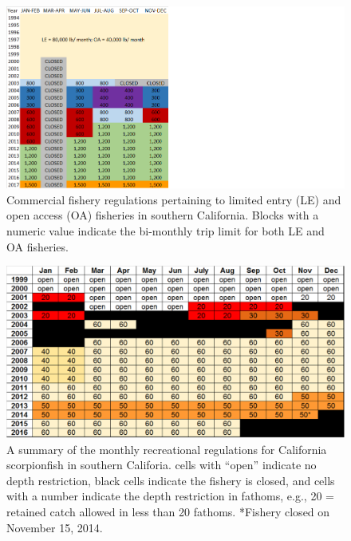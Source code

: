 \documentclass[12pt,]{article}
\begin{document}
\FloatBarrier

\begin{figure}[htbp]
\centering
\includegraphics{Figures/Com_regs.png}
\caption{Commercial fishery regulations pertaining to limited entry (LE)
and open access (OA) fisheries in southern California. Blocks with a
numeric value indicate the bi-monthly trip limit for both LE and OA
fisheries. \label{fig:Com_regs}}
\end{figure}

\FloatBarrier

\FloatBarrier

\begin{figure}[htbp]
\centering
\includegraphics{Figures/Rec_regs.pdf}
\caption{A summary of the monthly recreational regulations for
California scorpionfish in southern Califoria. cells with ``open''
indicate no depth restriction, black cells indicate the fishery is
closed, and cells with a number indicate the depth restriction in
fathoms, e.g., 20 = retained catch allowed in less than 20 fathoms.
*Fishery closed on November 15, 2014. \label{fig:recregs}}
\end{figure}
\end{document}
